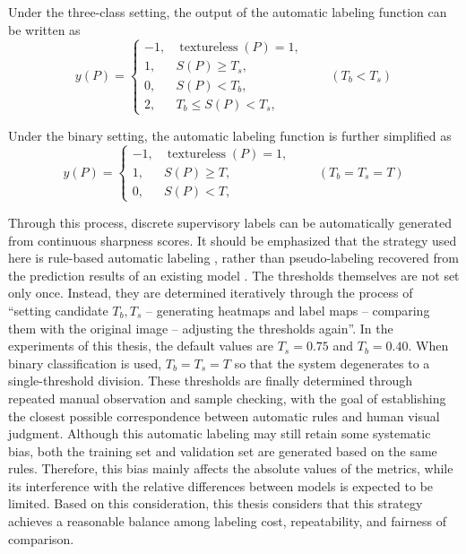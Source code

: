 \par Under the three-class setting, the output of the automatic labeling
function can be written as
\begin{equation}
    y(P)=
    \begin{cases}
        -1, & \operatorname{textureless}(P)=1, \\
        1,  & S(P)\ge T_s,                     \\
        0,  & S(P)<T_b,                        \\
        2,  & T_b\le S(P)<T_s,
    \end{cases}
    \qquad (T_b<T_s)
    \label{eq:tri-label}
\end{equation}
\par Under the binary setting, the automatic labeling function is further
simplified as
\begin{equation}
    y(P)=
    \begin{cases}
        -1, & \operatorname{textureless}(P)=1, \\
        1,  & S(P)\ge T,                       \\
        0,  & S(P)<T,
    \end{cases}
    \qquad (T_b=T_s=T)
    \label{eq:binary-label}
\end{equation}
\par Through this process, discrete supervisory labels can be automatically
generated from continuous sharpness scores. It should be emphasized that the
strategy used here is rule-based automatic labeling \cite{5739529,1284395},
rather than pseudo-labeling recovered from the prediction results of an
existing model \cite{lee2013pseudo}. The thresholds themselves are not set only
once. Instead, they are determined iteratively through the process of
``setting candidate $T_b,T_s$ -- generating heatmaps and label maps --
comparing them with the original image -- adjusting the thresholds again''.
In the experiments of this thesis, the default values are $T_s=0.75$ and
$T_b=0.40$. When binary classification is used, $T_b=T_s=T$ so that the system
degenerates to a single-threshold division. These thresholds are finally
determined through repeated manual observation and sample checking, with the
goal of establishing the closest possible correspondence between automatic
rules and human visual judgment. Although this automatic labeling may still
retain some systematic bias, both the training set and validation set are
generated based on the same rules. Therefore, this bias mainly affects the
absolute values of the metrics, while its interference with the relative
differences between models is expected to be limited. Based on this
consideration, this thesis considers that this strategy achieves a reasonable
balance among labeling cost, repeatability, and fairness of comparison.

